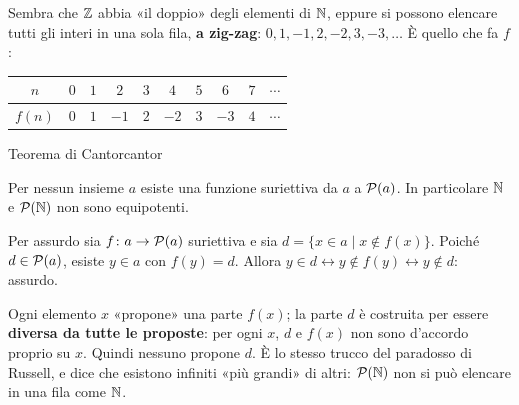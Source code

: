 \begin{spiegazione}
    Sembra che $\mathbb{Z}$ abbia «il doppio» degli elementi di $\mathbb{N}$, eppure si possono elencare tutti gli interi in una sola fila,
    \textbf{a zig-zag}: $0, 1, -1, 2, -2, 3, -3, \dots$ È quello che fa $f$:
    \begin{center}
    \renewcommand{\arraystretch}{1.2}
    \begin{tabular}{c|ccccccccc}
        $n$ & $0$ & $1$ & $2$ & $3$ & $4$ & $5$ & $6$ & $7$ & $\cdots$ \\ \hline
        $f(n)$ & $0$ & $1$ & $-1$ & $2$ & $-2$ & $3$ & $-3$ & $4$ & $\cdots$ \\
    \end{tabular}

    \medskip
    \end{center}
\end{spiegazione}

\begin{concetto}
\begin{Teorema}{Teorema di Cantor}{cantor}
    \begin{prerequisiti}
    \end{prerequisiti}
    Per nessun insieme $a$ esiste una funzione suriettiva da $a$ a $\mathcal{P}(a)$. In particolare $\mathbb{N}$ e $\mathcal{P}(\mathbb{N})$ non sono equipotenti.
\end{Teorema}
\begin{dimostrazione}
    \facoltativa
    Per assurdo sia $f \colon a \to \mathcal{P}(a)$ suriettiva e sia $d = \{x \in a \mid x \notin f(x)\}$. Poiché $d \in \mathcal{P}(a)$, esiste $y \in a$ con
    $f(y) = d$. Allora $y \in d \leftrightarrow y \notin f(y) \leftrightarrow y \notin d$: assurdo.
\end{dimostrazione}
\end{concetto}

\begin{spiegazione}
    Ogni elemento $x$ «propone» una parte $f(x)$; la parte $d$ è costruita per essere \textbf{diversa da tutte le proposte}: per
    ogni $x$, $d$ e $f(x)$ non sono d'accordo proprio su $x$. Quindi nessuno propone $d$. È lo stesso trucco del paradosso di
    Russell, e dice che esistono infiniti «più grandi» di altri: $\mathcal{P}(\mathbb{N})$ non si può elencare in una fila come $\mathbb{N}$.
\end{spiegazione}

